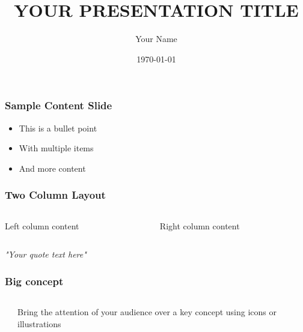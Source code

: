 \documentclass[aspectratio=169]{beamer}
\title{YOUR PRESENTATION TITLE}
\author{Your Name}
\institute{Your Institution}
\date{\today}
\begin{document}
\begin{frame}
\titlepage
\end{frame}

\begin{frame}
\frametitle{Sample Content Slide}
\begin{itemize}
    \item This is a bullet point
    \item With multiple items
    \item And more content
\end{itemize}
\end{frame}

\begin{frame}
\frametitle{Two Column Layout}
\begin{columns}[T]
    \begin{column}{0.48\textwidth}
        Left column content
    \end{column}
    \begin{column}{0.48\textwidth}
        Right column content
    \end{column}
\end{columns}
\end{frame}

\begin{frame}[plain]
\begin{center}
\large
\textit{"Your quote text here"}
\end{center}
\end{frame}


\begin{frame}
\frametitle{Big concept}
\begin{columns}[T]
    \begin{column}{0.4\textwidth}
    \end{column}
    \begin{column}{0.6\textwidth}
        \LARGE Bring the attention of your audience over a key concept using icons or illustrations
    \end{column}
\end{columns}
\end{frame}
\end{document}
